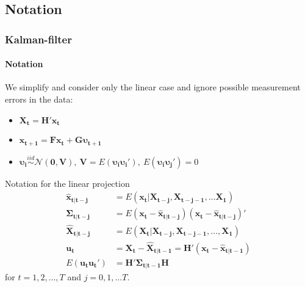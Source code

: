 \documentclass{beamer} %
\begin{document}
\subsection{Notation}
\begin{frame}\frametitle{Kalman-filter}\framesubtitle{Notation}
We simplify and consider only the linear case and ignore possible measurement errors in the data:
\begin{itemize}
    \item $\mathbf{X_t} = \mathbf{H}'\mathbf{x_t}$
    \item $    \mathbf{x_{t+1}} = \mathbf{F} \mathbf{x_t} + \mathbf{G}\boldsymbol{\upsilon_{t+1}}$
    \item $\boldsymbol{\upsilon_{i}} \overset{iid}{\sim} \mathcal{N}(\mathbf{0},\mathbf{V}),~ \mathbf{V} = E(\boldsymbol{\upsilon_{i}} \boldsymbol{\upsilon_{i}}'), ~ E(\boldsymbol{\upsilon_{i}} \boldsymbol{\upsilon_{j}}')=0$
  \end{itemize}
\scriptsize
\begin{block}{Notation for the linear projection}
\begin{align*}
\mathbf{\widehat{x}_{t|t-j}} &= E(\mathbf{x_t}|\mathbf{X_{t-j}},\mathbf{X_{t-j-1}},\dots \mathbf{X_{1}})\\
\boldsymbol{\Sigma_{t|t-j}} &= E(\mathbf{x_t}-\mathbf{\widehat{x}_{t|t-j}})(\mathbf{x_t}-\mathbf{\widehat{x}_{t|t-j}})'\\
\mathbf{\widehat{X}_{t|t-j}} &= E(\mathbf{X_t|X_{t-j}},\mathbf{X_{t-j-1}},\dots,\mathbf{X_1})\\
\mathbf{u_t} &= \mathbf{X_t} - \mathbf{\widehat{X}_{t|t-1}} = \mathbf{H'} (\mathbf{x_t} - \mathbf{\widehat{x}_{t|t-1}})\\
E(\mathbf{u_t}\mathbf{u_t}')&= \mathbf{H'} \boldsymbol{\Sigma_{t|t-1}} \mathbf{H}
\end{align*}
for $t=1,2,\dots,T$ and $j=0,1,\dots T$.
\end{block}

\end{frame}
\end{document}
